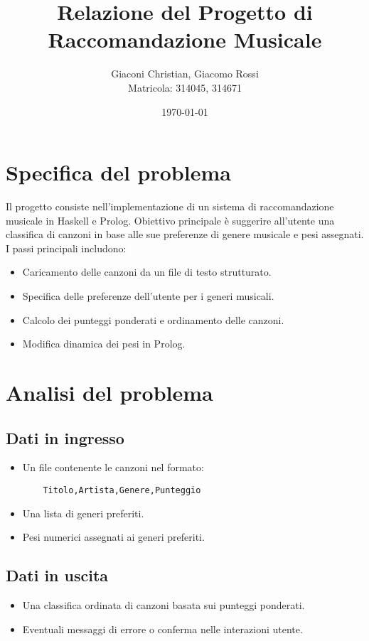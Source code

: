 \documentclass[a4paper,11pt]{article}
\title{\textbf{Relazione del Progetto di Raccomandazione Musicale}}
\author{Giaconi Christian, Giacomo Rossi\\Matricola: 314045, 314671}
\date{\today}
\begin{document}
\maketitle

\newpage
\tableofcontents

\newpage
\section{Specifica del problema}
Il progetto consiste nell'implementazione di un sistema di raccomandazione musicale in Haskell e Prolog. Obiettivo principale è suggerire all'utente una classifica di canzoni in base alle sue preferenze di genere musicale e pesi assegnati. I passi principali includono:
\begin{itemize}
    \item Caricamento delle canzoni da un file di testo strutturato.
    \item Specifica delle preferenze dell'utente per i generi musicali.
    \item Calcolo dei punteggi ponderati e ordinamento delle canzoni.
    \item Modifica dinamica dei pesi in Prolog.
\end{itemize}

\newpage
\section{Analisi del problema}
\subsection{Dati in ingresso}
\begin{itemize}
    \item Un file contenente le canzoni nel formato:
    \begin{verbatim}
    Titolo,Artista,Genere,Punteggio
    \end{verbatim}
    \item Una lista di generi preferiti.
    \item Pesi numerici assegnati ai generi preferiti.
\end{itemize}

\subsection{Dati in uscita}
\begin{itemize}
    \item Una classifica ordinata di canzoni basata sui punteggi ponderati.
    \item Eventuali messaggi di errore o conferma nelle interazioni utente.
\end{itemize}
\end{document}
